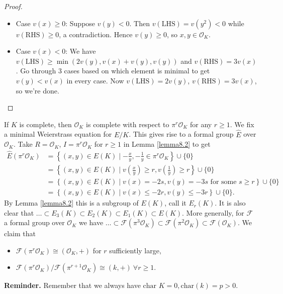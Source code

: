 \documentclass{article}
\theoremstyle{definition}
\begin{document}
\begin{proof}
    \begin{itemize}
        \item Case $v(x)\ge 0$: Suppose $v(y)<0$. Then $v(\text{LHS})=v(y^2)<0$ while $v(\text{RHS})\ge 0$, a contradiction. Hence $v(y)\ge 0$, so $x,y \in \mathcal{O}_K$.
        \item Case $v(x)<0$: We have $v(\text{LHS})\ge \min(2v(y),v(x)+v(y),v(y))$ and $v(\text{RHS})=3v(x)$. Go through 3 cases based on which element is minimal to get $v(y)<v(x)$ in every case. Now $v(\text{LHS})=2v(y)$, $v(\text{RHS})=3v(x)$, so we're done.
    \end{itemize}
\end{proof}
If $K$ is complete, then $\mathcal{O}_K$ is complete with respect to $\pi^r\mathcal{O}_K$ for any $r\ge 1$. We fix a minimal Weierstrass equation for $E/K$. This gives rise to a formal group $\widehat{E}$ over $\mathcal{O}_K$. Take $R = \mathcal{O}_K$, $I = \pi^r \mathcal{O}_K$ for $r\ge 1$ in Lemma \ref{lemma8.2} to get 
\begin{align*}
    \widehat{E}(\pi^r \mathcal{O}_K) &= \left\{(x,y) \in E(K) \mid -\frac{x}{y},-\frac{1}{y} \in \pi^r \mathcal{O}_K \right\} \cup \{0\} \\
    &= \left\{(x,y) \in E(K) \mid v \left(\frac{x}{y}\right)\ge r, v \left(\frac{1}{y}\right)\ge r\right\} \cup \{0\} \\
    &= \left\{(x,y) \in E(K) \mid v(x)=-2s, v(y)=-3s \text{ for some }s\ge r \right\} \cup\{0\} \\
    &= \left\{(x,y) \in E(K) \mid v(x) \le -2r, v(y) \le -3r \right\} \cup \{0\}.
\end{align*}
By Lemma \ref{lemma8.2} this is a subgroup of $E(K)$, call it $E_r(K)$. It is also clear that $\ldots \subset E_3(K) \subset E_2(K) \subset E_1(K) \subset E(K)$. More generally, for $\mathcal{F}$ a formal group over $\mathcal{O}_K$ we have $\ldots \subset \mathcal{F}(\pi^3 \mathcal{O}_K) \subset \mathcal{F}(\pi^2 \mathcal{O}_K) \subset \mathcal{F}(\mathcal{O}_K)$. We claim that 
\begin{itemize}
    \item $\mathcal{F}(\pi^r \mathcal{O}_K) \cong (\mathcal{O}_K, +)$ for $r$ sufficiently large,
    \item $\mathcal{F}(\pi^r \mathcal{O}_K)/\mathcal{F}(\pi^{r+1} \mathcal{O}_K) \cong (k,+) ~\forall r\ge 1$.
\end{itemize}
\textbf{Reminder.} Remember that we always have $\text{char }K = 0, \text{char}(k) = p > 0$.
\end{document}
